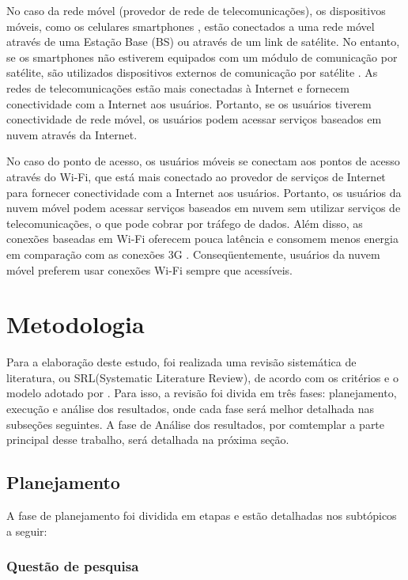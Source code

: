 \documentclass[12pt]{article}
\begin{document}
No caso da rede móvel (provedor de rede de telecomunicações), os dispositivos móveis, como os celulares smartphones \cite{satelite},
estão conectados a uma rede móvel através de uma Estação Base (BS) ou através de um link de satélite. No entanto,
se os smartphones não estiverem equipados com um módulo de comunicação por satélite, são utilizados dispositivos
externos de comunicação por satélite \cite{spot}. As redes de telecomunicações estão mais conectadas à Internet e
fornecem conectividade com a Internet aos usuários. Portanto, se os usuários tiverem conectividade de rede móvel,
os usuários podem acessar serviços baseados em nuvem através da Internet.

No caso do ponto de acesso, os usuários móveis se conectam aos pontos de acesso através do Wi-Fi, que está mais conectado
ao provedor de serviços de Internet para fornecer conectividade com a Internet aos usuários. Portanto, os usuários da nuvem móvel
podem acessar serviços baseados em nuvem sem utilizar serviços de telecomunicações, o que pode cobrar por tráfego de dados.
Além disso, as conexões baseadas em Wi-Fi oferecem pouca latência e consomem menos energia em comparação com as conexões 3G \cite{cuervo2010}.
Conseqüentemente, usuários da nuvem móvel preferem usar conexões Wi-Fi sempre que acessíveis.

\section{Metodologia}

Para a elaboração deste estudo, foi realizada uma revisão sistemática de literatura,
ou SRL(Systematic Literature Review), de acordo com os critérios e o modelo adotado
por \cite{kitchenham2012}. Para isso, a revisão foi divida em três fases: planejamento,
execução e análise dos resultados, onde cada fase será melhor detalhada nas subseções seguintes.
A fase de Análise dos resultados, por comtemplar a parte principal desse trabalho, será detalhada
na próxima seção.

\subsection{Planejamento}

A fase de planejamento foi dividida em etapas e estão detalhadas nos subtópicos a seguir:

\subsubsection{Questão de pesquisa}
\end{document}
